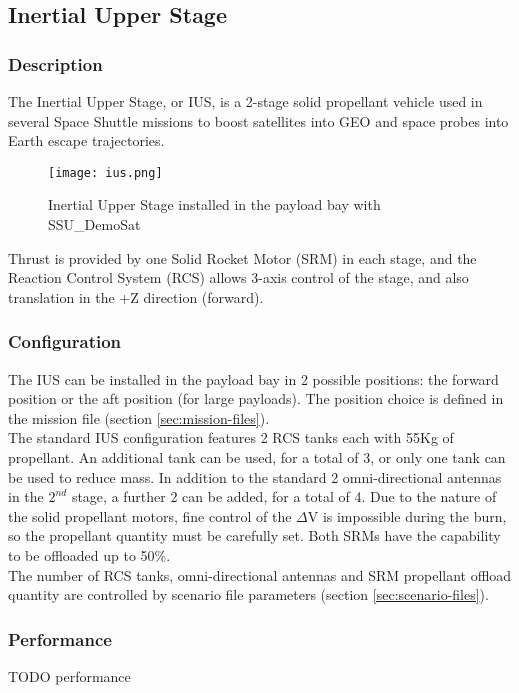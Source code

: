 \documentclass[Space_Shuttle_Ultra_Manual.tex]{subfiles}
\begin{document}
\subsection{Inertial Upper Stage}
\begin{multicols*}{2}
\renewcommand{\cfttoctitlefont}{\bf}
\localtableofcontents
\subsubsection{Description}
\noindent
The Inertial Upper Stage, or IUS, is a 2-stage solid propellant vehicle used in several Space Shuttle missions to boost satellites into GEO and space probes into Earth escape trajectories.
\\
\begin{figure}[H]
	\centering
	\captionsetup{justification=centering}
  \texttt{[image: ius.png]}
  \caption{Inertial Upper Stage installed in the payload bay with SSU\_DemoSat}
  \label{fig:ius}
\end{figure}

Thrust is provided by one Solid Rocket Motor (SRM) in each stage, and the Reaction Control System (RCS) allows 3-axis control of the stage, and also translation in the +Z direction (forward).\\

\subsubsection{Configuration}
The IUS can be installed in the payload bay in 2 possible positions: the forward position or the aft position (for large payloads). The position choice is defined in the mission file (section \ref{sec:mission-files}).\\
The standard IUS configuration features 2 RCS tanks each with 55Kg of propellant. An additional tank can be used, for a total of 3, or only one tank can be used to reduce mass. In addition to the standard 2 omni-directional antennas in the $2^{nd}$ stage, a further 2 can be added, for a total of 4. Due to the nature of the solid propellant motors, fine control of the $\Delta$V is impossible during the burn, so the propellant quantity must be carefully set. Both SRMs have the capability to be offloaded up to 50\%.\\
The number of RCS tanks, omni-directional antennas and SRM propellant offload quantity are controlled by scenario file parameters (section \ref{sec:scenario-files}).

\subsubsection{Performance}
TODO performance\\


\end{multicols*}
\end{document}
